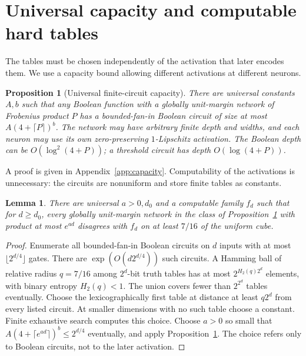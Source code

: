\documentclass[11pt]{article}
\newtheorem{lemma}[theorem]{Lemma}
\newtheorem{proposition}[theorem]{Proposition}
\theoremstyle{remark}\newtheorem{remark}[theorem]{Remark}
\begin{document}
\section{Universal capacity and computable hard tables}
The tables must be chosen independently of the activation that later
encodes them. We use a capacity bound allowing different activations
at different neurons.
\begin{proposition}[Universal finite-circuit capacity]\label{prop:capacity}
There are universal constants $A,b$ such that any Boolean function
with a globally unit-margin network of Frobenius product $P$ has a
bounded-fan-in Boolean circuit of size at most
$A(4+\lceil P\rceil)^b$. The network may have arbitrary finite depth
and widths, and each neuron may use its own zero-preserving
$1$-Lipschitz activation. The Boolean depth can be
$O(\log^2(4+P))$; a threshold circuit has depth $O(\log(4+P))$.
\end{proposition}
A proof is given in Appendix~\ref{app:capacity}. Computability of
the activations is unnecessary: the circuits are nonuniform and
store finite tables as constants.

\begin{lemma}\label{lem:hard}
There are universal $a>0,d_0$ and a computable family $f_d$ such
that for $d\ge d_0$, every globally unit-margin network in the class
of Proposition~\ref{prop:capacity} with product at most $e^{ad}$
disagrees with $f_d$ on at least $7/16$ of the uniform cube.
\end{lemma}
\begin{proof}
Enumerate all bounded-fan-in Boolean circuits on $d$ inputs with
at most $\lfloor2^{d/4}\rfloor$ gates. There are
$\exp(O(d2^{d/4}))$ such circuits. A Hamming ball of relative radius
$q=7/16$ among $2^d$-bit truth tables has at most
$2^{H_2(q)2^d}$ elements, with binary entropy $H_2(q)<1$.
The union covers fewer than $2^{2^d}$ tables eventually. Choose
the lexicographically first table at distance at least $q2^d$
from every listed circuit. At smaller dimensions with no such
table choose a constant. Finite exhaustive search computes this
choice. Choose $a>0$ so small that
$A(4+\lceil e^{ad}\rceil)^b\le2^{d/4}$ eventually, and apply
Proposition~\ref{prop:capacity}. The choice refers only to Boolean
circuits, not to the later activation.
\end{proof}
\end{document}
